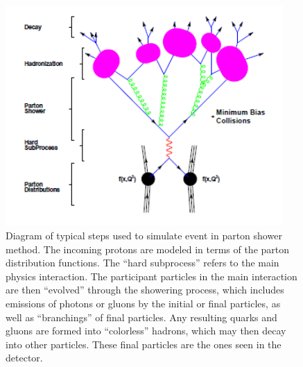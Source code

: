



 \begin{figure}[htb]
  \begin{center}
    \includegraphics[width=300pt]{Figures/mc-partonShower-lesHouches.png}
  \end{center}
  \caption[\fixspacing Diagram of typical steps used to simulate event in parton shower method]
	  {\fixspacing Diagram of typical steps used to simulate event in parton shower method.
	    The incoming protons are modeled in terms of the 
	    parton distribution functions. 
	    The ``hard subprocess'' refers to the main 
	    physics interaction.  
	    The participant particles in the main interaction 
	    are then ``evolved'' through the showering process, 
	    which includes emissions of photons or gluons 
	    by the initial or final particles, 
	    as well as ``branchings'' of final particles. %
	    Any resulting quarks and gluons are 
	    formed into ``colorless'' hadrons, 
	    which may then decay into other particles. 
	    These final particles are the ones seen 
	    in the detector.  
	  }
  \label{fig:MCsteps}
 \end{figure}


